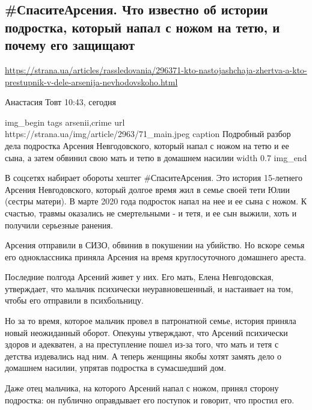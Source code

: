  
 

\subsection{#СпаситеАрсения. Что известно об истории подростка, который напал с ножом на тетю, и почему его защищают}
\label{sec:22_10_2020.news.ua.strana.1.save_arsenii}

\url{https://strana.ua/articles/rassledovania/296371-kto-nastojashchaja-zhertva-a-kto-prestupnik-v-dele-arsenija-nevhodovskoho.html}

Анастасия Товт 10:43, сегодня 

\ifcmt
img_begin 
	tags arsenii,crime
	url https://strana.ua/img/article/2963/71_main.jpeg
	caption Подробный разбор дела подростка Арсения Невгодовского, который напал с ножом на тетю и ее сына, а затем обвинил свою мать и тетю в домашнем насилии 
	width 0.7
img_end
\fi

В соцсетях набирает обороты хештег #СпаситеАрсения. Это история 15-летнего
Арсения Невгодовского, который долгое время жил в семье своей тети Юлии
(сестры матери). В марте 2020 года подросток напал на нее и ее сына с ножом. К
счастью, травмы оказались не смертельными - и тетя, и ее сын выжили, хоть и
получили серьезные ранения. 

Арсения отправили в СИЗО, обвинив в покушении на убийство. Но вскоре семья его
одноклассника приняла Арсения на время круглосуточного домашнего ареста.

Последние полгода Арсений живет у них. Его мать, Елена Невгодовская,
утверждает, что мальчик психически неуравновешенный, и настаивает на том, чтобы
его отправили в психбольницу. 

Но за то время, которое мальчик провел в патронатной семье, история приняла
новый неожиданный оборот. Опекуны утверждают, что Арсений психически здоров и
адекватен, а на преступление пошел из-за того, что мать и тетя с детства
издевались над ним. А теперь женщины якобы хотят замять дело о домашнем
насилии, упрятав подростка в сумасшедший дом. 

Даже отец мальчика, на которого Арсений напал с ножом, принял сторону
подростка: он публично оправдывает его поступок и говорит, что простил его.

